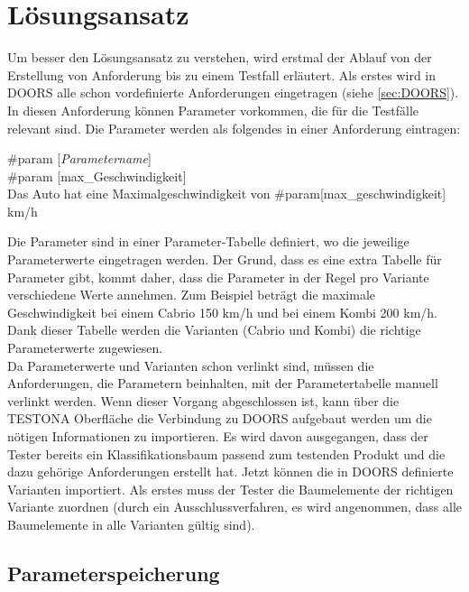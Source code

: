\chapter{Lösungsansatz}\label{chp:loesungsansatz}

Um besser den Lösungsansatz zu verstehen, wird erstmal der Ablauf von der Erstellung von Anforderung bis zu einem Testfall erläutert. Als erstes wird in DOORS alle schon vordefinierte Anforderungen eingetragen (siehe \ref{sec:DOORS}). In diesen Anforderung können Parameter vorkommen, die für die Testfälle relevant sind. Die Parameter werden als folgendes in einer Anforderung eintragen:\\

\begin{center}
\#param [\textit{Parametername}]\\
\#param [max\_Geschwindigkeit]\\
Das Auto hat eine Maximalgeschwindigkeit von \#param[max\_geschwindigkeit] km/h
\end{center}

Die Parameter sind in einer Parameter-Tabelle definiert, wo die jeweilige Parameterwerte eingetragen werden. Der Grund, dass es eine extra Tabelle für Parameter gibt, kommt daher, dass die Parameter in der Regel pro Variante verschiedene Werte annehmen. Zum Beispiel beträgt die maximale Geschwindigkeit bei einem Cabrio 150 km/h  und bei einem Kombi 200 km/h. Dank dieser Tabelle werden die Varianten (Cabrio und Kombi) die richtige Parameterwerte zugewiesen.\\

Da Parameterwerte und Varianten schon verlinkt sind, müssen die Anforderungen, die Parametern beinhalten, mit der Parametertabelle manuell verlinkt werden. Wenn dieser Vorgang abgeschlossen ist, kann über die TESTONA Oberfläche die Verbindung zu DOORS aufgebaut werden um die nötigen Informationen zu importieren. Es wird davon ausgegangen, dass der Tester bereits ein Klassifikationsbaum passend zum testenden Produkt und die dazu gehörige Anforderungen erstellt hat. Jetzt können die in DOORS definierte Varianten importiert. Als erstes muss der Tester die Baumelemente der richtigen Variante zuordnen (durch ein Ausschlussverfahren, es wird angenommen, dass alle Baumelemente in alle Varianten gültig sind). 


\newpage
\section{Parameterspeicherung}\label{sec.parameterspeicherung}
